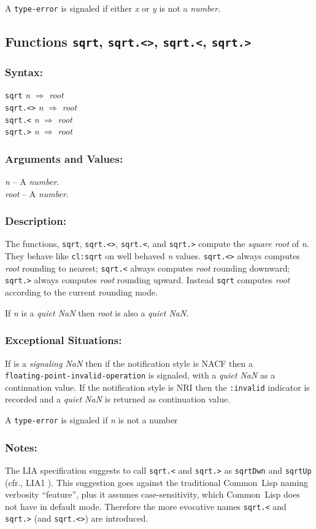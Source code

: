 \documentclass[10pt,fleqn]{article}
\newcommand{\CL}{\textsf{Common~Lisp}}
\newcommand{\code}[1]{\texttt{#1}}
\newcommand{\clliaterm}[1]{\textit{#1}}
\newcommand{\varname}[1]{\textit{#1}}
\newcommand{\clterm}[1]{\textit{#1}}
\newcommand{\RArrow}{$\Rightarrow$}
\newcommand{\DDictionaryItem}[1]{\vspace*{6pt}\noindent\hrulefill\vspace*{-9pt}\subsection*{#1}}
\newcommand{\DSyntax}{\subsubsection*{Syntax:}}
\newcommand{\DArgsNValues}{\subsubsection*{Arguments and Values:}}
\newcommand{\DDescription}{\subsubsection*{Description:}}
\newcommand{\DExceptional}{\subsubsection*{Exceptional Situations:}}
\newcommand{\DNotes}{\subsubsection*{Notes:}}
\begin{document}
A \code{type-error} is signaled if either \varname{x} or \varname{y} is
not a \clliaterm{number}.


\DDictionaryItem{Functions \code{sqrt}, \code{sqrt.<>}, \code{sqrt.<},
  \code{sqrt.>}}
\index{S!\code{sqrt}}
\index{S!\code{sqrt.<>}}
\index{S!\code{sqrt.<}}
\index{S!\code{sqrt.>}}


\DSyntax{}

\code{sqrt} \varname{n} \RArrow{} \varname{root}\\
\code{sqrt.<>} \varname{n} \RArrow{} \varname{root}\\
\code{sqrt.<} \varname{n} \RArrow{} \varname{root}\\
\code{sqrt.>} \varname{n} \RArrow{} \varname{root}

\DArgsNValues{}

\varname{n} -- A \clterm{number}.\\
\varname{root} -- A \clterm{number}.

\DDescription{}

The functions, \code{sqrt}, \code{sqrt.<>}, \code{sqrt.<}, and
\code{sqrt.>} compute the \emph{square root} of \varname{n}.  They
behave like \code{cl:sqrt} on well behaved \varname{n} values.
\code{sqrt.<>} always computes \varname{root} rounding to nearest;
\code{sqrt.<} always computes \varname{root} rounding downward;
\code{sqrt.>} always computes \varname{root} rounding upward. Instead
\code{sqrt} computes \varname{root} according to the current rounding
mode.

If \varname{n} is a \clliaterm{quiet NaN} then \varname{root} is also
a \clliaterm{quiet NaN}.


\DExceptional{}

If \varname{} is a \clliaterm{signaling NaN} then if the notification
style is NACF then a\\
\code{floating-point-invalid-operation} is
signaled, with a \clliaterm{quiet NaN} as a continuation value.  If
the notification style is NRI then the \code{:invalid} indicator is
recorded and a \clliaterm{quiet NaN} is returned as continuation
value.


A \code{type-error} is signaled if \varname{n} is not a number

\DNotes{}

The LIA specification suggests to call \code{sqrt.<} and \code{sqrt.>}
as \code{sqrtDwn} and \code{sqrtUp} (cfr., LIA1
\cite{2012:LIA1}). This suggestion goes against the traditional \CL{}
naming verbosity ``feature'', plus it assumes case-sensitivity, which
\CL{} does not have in default mode.  Therefore the more evocative
names \code{sqrt.<} and \code{sqrt.>} (and \code{sqrt.<>}) are
introduced.
\end{document}
